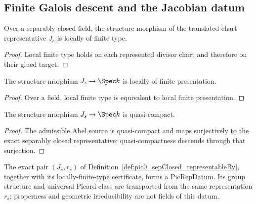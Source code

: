 \subsection{Finite Galois descent and the Jacobian datum}

\begin{theorem}
  \label{thm:pic0SepClosed_lft}
  \leanok
  Over a separably closed field, the structure morphism of the translated-chart
  representative \(J_s\) is locally of finite type.
\end{theorem}
\begin{proof}
  \leanok
  Local finite type holds on each represented divisor chart and therefore on their glued
  target.
\end{proof}

\begin{theorem}
  \label{thm:pic0SepClosed_lfp}
  \leanok
  The structure morphism \(J_s\to\Spec k\) is locally of finite presentation.
\end{theorem}
\begin{proof}
  \leanok
  Over a field, local finite type is equivalent to local finite presentation.
\end{proof}

\begin{theorem}
  \label{thm:pic0SepClosed_qc}
  \leanok
  The structure morphism \(J_s\to\Spec k\) is quasi-compact.
\end{theorem}
\begin{proof}
  \leanok
  The admissible Abel source is quasi-compact and maps surjectively to the exact
  separably closed representative; quasi-compactness descends through that surjection.
\end{proof}

\begin{definition}
  \label{def:pic0SepClosedDescentInput}
  \leanok
  The exact pair \((J_s,r_s)\) of
  Definition~\ref{def:pic0_sepClosed_representableBy}, together with its locally-finite-type
  certificate, forms a \(\mathrm{PicRepDatum}\).  Its group structure and universal Picard
  class are transported from the same representation \(r_s\); properness and geometric
  irreducibility are not fields of this datum.
\end{definition}

